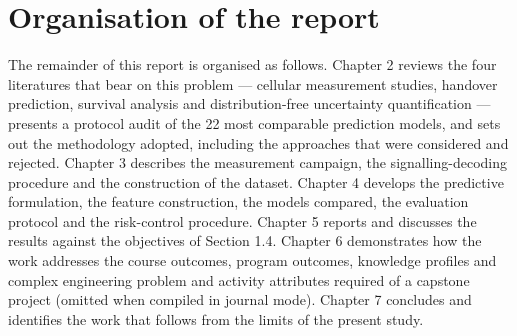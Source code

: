 \section{Organisation of the report}
\label{sec:1_7}

The remainder of this report is organised as follows. Chapter 2 reviews the four literatures that bear on this problem --- cellular measurement studies, handover prediction, survival analysis and distribution-free uncertainty quantification --- presents a protocol audit of the 22 most comparable prediction models, and sets out the methodology adopted, including the approaches that were considered and rejected. Chapter 3 describes the measurement campaign, the signalling-decoding procedure and the construction of the dataset. Chapter 4 develops the predictive formulation, the feature construction, the models compared, the evaluation protocol and the risk-control procedure. Chapter 5 reports and discusses the results against the objectives of Section 1.4. Chapter 6 demonstrates how the work addresses the course outcomes, program outcomes, knowledge profiles and complex engineering problem and activity attributes required of a capstone project (omitted when compiled in journal mode). Chapter 7 concludes and identifies the work that follows from the limits of the present study.

